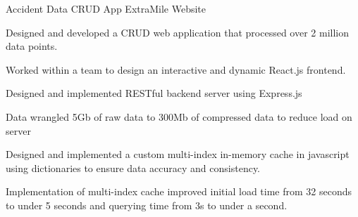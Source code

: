 \cventry
{Accident Data CRUD App} %
{ExtraMile Website} %
{\href{https://github.com/giathuan123/extramile}{\faGithubSquare}} %
{\diExpressOriginal \diReactPlainWordmark \diNodejsPlain \diPythonPlain } %
{
	\begin{cvitems} %
		\item Designed and developed a CRUD web application that processed over 2 million
		data points.
		\item Worked within a team to design an interactive and dynamic React.js frontend.
		\item Designed and implemented RESTful backend server using Express.js
		\item Data wrangled 5Gb of raw data to 300Mb of compressed data to reduce load on
		server
		\item Designed and implemented a custom multi-index in-memory cache in javascript
		using dictionaries to ensure data accuracy and consistency.
		\item Implementation of multi-index cache improved initial load time from 32 seconds
		to under 5 seconds and querying time from 3s to under a second.
	\end{cvitems}
}

